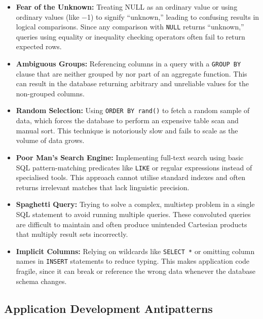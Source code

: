 \begin{itemize}
    \item \textbf{Fear of the Unknown:}  Treating NULL as an ordinary value or using ordinary values (like \num{-1}) to signify “unknown,” leading to confusing results in logical comparisons. Since any comparison with \texttt{NULL} returns “unknown,” queries using equality or inequality checking operators often fail to return expected rows.
    \item \textbf{Ambiguous Groups:}  Referencing columns in a query with a \texttt{GROUP BY} clause that are neither grouped by nor part of an aggregate function. This can result in the database returning arbitrary and unreliable values for the non-grouped columns.
    \item \textbf{Random Selection:}  Using \texttt{ORDER BY rand()} to fetch a random sample of data, which forces the database to perform an expensive table scan and manual sort. This technique is notoriously slow and fails to scale as the volume of data grows.
    \item \textbf{Poor Man's Search Engine:}  Implementing full-text search using basic SQL pattern-matching predicates like \texttt{LIKE} or regular expressions instead of specialised tools. This approach cannot utilise standard indexes and often returns irrelevant matches that lack linguistic precision.
    \item \textbf{Spaghetti Query:}  Trying to solve a complex, multistep problem in a single SQL statement to avoid running multiple queries. These convoluted queries are difficult to maintain and often produce unintended Cartesian products that multiply result sets incorrectly.
    \item \textbf{Implicit Columns:}  Relying on wildcards like \texttt{SELECT *} or omitting column names in \texttt{INSERT} statements to reduce typing. This makes application code fragile, since it can break or reference the wrong data whenever the database schema changes.
\end{itemize}

\subsection{Application Development Antipatterns}\label{sec:developmentAntipatterns}

